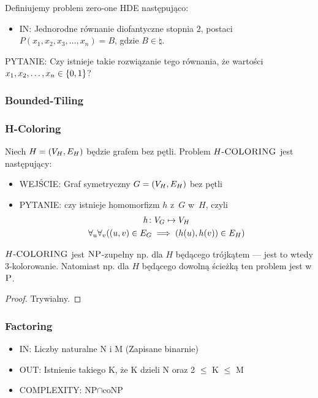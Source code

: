 \begin{definition}
	Definiujemy problem zero-one HDE następująco:

	\begin{itemize}
		\item \textsc{IN:} Jednorodne równanie diofantyczne stopnia 2, postaci \(P(x_1, x_2, x_3, \dots, x_n) = B\), gdzie \(B \in \natural\).
	\end{itemize}
	\item \textsc{PYTANIE:} Czy istnieje takie rozwiązanie tego równania, że wartości \( x_1, x_2, \dots, x_n \in \set{0,1}\)?
\end{definition}

\subsubsection{Bounded-Tiling}

\begin{definition}

\end{definition}

\subsubsection{H-Coloring}
Niech \(H = \left(V_H, E_H\right)\) będzie grafem bez pętli. Problem \(H\textsc{-COLORING}\) jest następujący:
\begin{itemize}
	\item WEJŚCIE: Graf symetryczny \(G = \left(V_H, E_H\right)\) bez pętli
	\item PYTANIE: czy istnieje homomorfizm \(h\) z~\(G\) w~\(H\), czyli
	      \begin{gather*}
		      h\colon V_G \mapsto V_H\\
		      \forall_u\forall_v\pars{\pars{u, v} \in E_G \implies \pars{h\pars{u}, h\pars{v}} \in E_H}
	      \end{gather*}
\end{itemize}
\(H\textsc{-COLORING}\) jest \(\textsc{NP}\)-zupełny np. dla \(H\) będącego trójkątem --- jest to wtedy \(3\)-kolorowanie. Natomiast np. dla \(H\) będącego dowolną ścieżką ten problem jest w \(\textsc{P}\).
\begin{proof}
	Trywialny.
\end{proof}

\subsubsection{Factoring}
\begin{itemize}
	\item IN: Liczby naturalne N i M (Zapisane binarnie)
	\item OUT: Istnienie takiego K, że K dzieli N oraz 2 \(\le\) K \(\le\) M
	\item COMPLEXITY: NP\(\cap\)coNP
\end{itemize}


